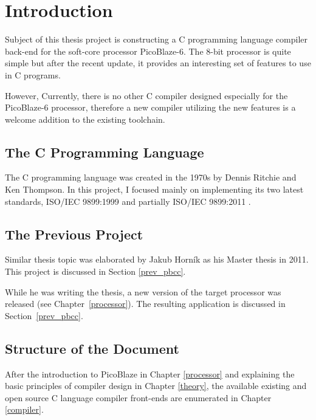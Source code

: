 
\newcommand{\todo}[1]{\textcolor{red}{TODO\:} \textcolor{gray}{#1}}

\chapter{Introduction}\label{introduction}

Subject of this thesis project is constructing a C programming language compiler back-end for the soft-core processor PicoBlaze-6. The 8-bit processor is quite simple but after the recent update, it provides an interesting set of features to use in C programs.

However, Currently, there is no other C compiler designed especially for the PicoBlaze-6 processor, therefore a new compiler utilizing the new features is a welcome addition to the existing toolchain.

    \section{The C Programming Language}

    The C programming language was created in the 1970s by Dennis Ritchie and Ken Thompson. In this project, I focused mainly on implementing its two latest standards, ISO/IEC 9899:1999 \cite{C99} and partially ISO/IEC 9899:2011 \cite{C11}.

    \section{The Previous Project}
    Similar thesis topic was elaborated by Jakub Horník as his Master thesis in 2011. This project is discussed in Section \ref{prev_pbcc}.

    While he was writing the thesis, a new version of the target processor was released (see Chapter~\ref{processor}). The resulting application is discussed in Section~\ref{prev_pbcc}.

    \section{Structure of the Document}

    After the introduction to PicoBlaze in Chapter \ref{processor} and explaining the basic principles of compiler design in Chapter \ref{theory}, the available existing and open source C language compiler front-ends are enumerated in Chapter \ref{compiler}.


